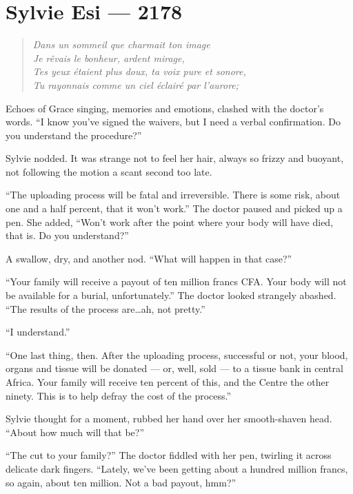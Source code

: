 \chapter*{Sylvie Esi — 2178}

\begin{quote}
\emph{Dans un sommeil que charmait ton image\\
Je rêvais le bonheur, ardent mirage,\\
Tes yeux étaient plus doux, ta voix pure et sonore,\\
Tu rayonnais comme un ciel éclairé par l'aurore;}
\end{quote}

\noindent Echoes of Grace singing, memories and emotions, clashed with the doctor's words. ``I know you've signed the waivers, but I need a verbal confirmation. Do you understand the procedure?''

Sylvie nodded. It was strange not to feel her hair, always so frizzy and buoyant, not following the motion a scant second too late.

``The uploading process will be fatal and irreversible. There is some risk, about one and a half percent, that it won't work.'' The doctor paused and picked up a pen. She added, ``Won't work after the point where your body will have died, that is. Do you understand?''

A swallow, dry, and another nod. ``What will happen in that case?''

``Your family will receive a payout of ten million francs CFA. Your body will not be available for a burial, unfortunately.'' The doctor looked strangely abashed. ``The results of the process are\ldots{}ah, not pretty.''

``I understand.''

``One last thing, then. After the uploading process, successful or not, your blood, organs and tissue will be donated --- or, well, sold --- to a tissue bank in central Africa. Your family will receive ten percent of this, and the Centre the other ninety. This is to help defray the cost of the process.''

Sylvie thought for a moment, rubbed her hand over her smooth-shaven head. ``About how much will that be?''

``The cut to your family?'' The doctor fiddled with her pen, twirling it across delicate dark fingers. ``Lately, we've been getting about a hundred million francs, so again, about ten million. Not a bad payout, hmm?''

